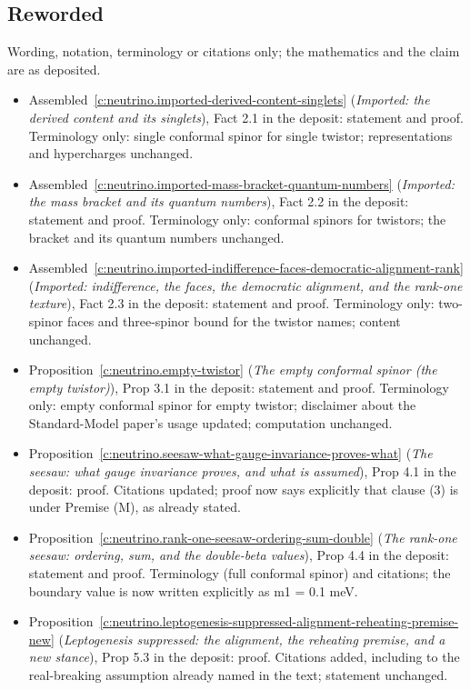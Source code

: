 \documentclass[11pt]{article}
\theoremstyle{definition}
\theoremstyle{plain}
\begin{document}
\subsection*{Reworded}
Wording, notation, terminology or citations only; the mathematics and the claim are as deposited.
\begin{itemize}\setlength{\itemsep}{2pt}
\item Assembled~\ref{c:neutrino.imported-derived-content-singlets} (\emph{Imported: the derived content and its singlets}), Fact 2.1 in the deposit: statement and proof. Terminology only: single conformal spinor for single twistor; representations and hypercharges unchanged.
\item Assembled~\ref{c:neutrino.imported-mass-bracket-quantum-numbers} (\emph{Imported: the mass bracket and its quantum numbers}), Fact 2.2 in the deposit: statement and proof. Terminology only: conformal spinors for twistors; the bracket and its quantum numbers unchanged.
\item Assembled~\ref{c:neutrino.imported-indifference-faces-democratic-alignment-rank} (\emph{Imported: indifference, the faces, the democratic alignment, and the rank-one texture}), Fact 2.3 in the deposit: statement and proof. Terminology only: two-spinor faces and three-spinor bound for the twistor names; content unchanged.
\item Proposition~\ref{c:neutrino.empty-twistor} (\emph{The empty conformal spinor (the empty twistor)}), Prop 3.1 in the deposit: statement and proof. Terminology only: empty conformal spinor for empty twistor; disclaimer about the Standard-Model paper's usage updated; computation unchanged.
\item Proposition~\ref{c:neutrino.seesaw-what-gauge-invariance-proves-what} (\emph{The seesaw: what gauge invariance proves, and what is assumed}), Prop 4.1 in the deposit: proof. Citations updated; proof now says explicitly that clause (3) is under Premise (M), as already stated.
\item Proposition~\ref{c:neutrino.rank-one-seesaw-ordering-sum-double} (\emph{The rank-one seesaw: ordering, sum, and the double-beta values}), Prop 4.4 in the deposit: statement and proof. Terminology (full conformal spinor) and citations; the boundary value is now written explicitly as m1 = 0.1 meV.
\item Proposition~\ref{c:neutrino.leptogenesis-suppressed-alignment-reheating-premise-new} (\emph{Leptogenesis suppressed: the alignment, the reheating premise, and a new stance}), Prop 5.3 in the deposit: proof. Citations added, including to the real-breaking assumption already named in the text; statement unchanged.
\end{itemize}
\end{document}
